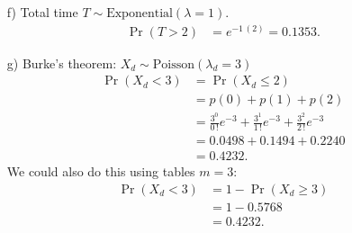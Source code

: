 \documentclass[12pt]{article}
\begin{document}
{\begin{minipage}[t]{0.98\textwidth}
\begin{minipage}[t]{0.47\textwidth}
\begin{enumerate}
\begin{align*}
\rho = \frac{\lambda_a}{\lambda_s} = \frac{3}{4} = 0.75.
\end{align*}
This means that the service component is working 75\% of the time, i.e., it is idle 25\% of the time.
\item[f)] Total time  $T \sim \text{Exponential}(\lambda=1)$.
\begin{align*}
\Pr(T > 2) &= e^{-1\,(2)} = 0.1353.
\end{align*}
\item[g)] Burke's theorem: $X_d \sim \text{Poisson}(\lambda_d=3)$
\begin{align*}
\Pr(X_d < 3) &= \Pr(X_d \le 2) \\
&= p(0) + p(1) + p(2) \\[0.2cm]
&= \frac{3^0}{0\,!}e^{-3} + \frac{3^1}{1\,!}e^{-3} + \frac{3^2}{2\,!}e^{-3}\\[0.2cm]
&=0.0498+0.1494+0.2240\\
&= 0.4232.
\end{align*}
We could also do this using tables $m = 3$:\\[-0.6cm]
\begin{align*}
\Pr(X_d < 3) &= 1 - \Pr(X_d \ge 3) \\
&=1 - 0.5768\\
&=0.4232.
\end{align*}
\end{enumerate}
\end{minipage}
\end{minipage}}\vspace{0.03\textwidth}
\end{document}
